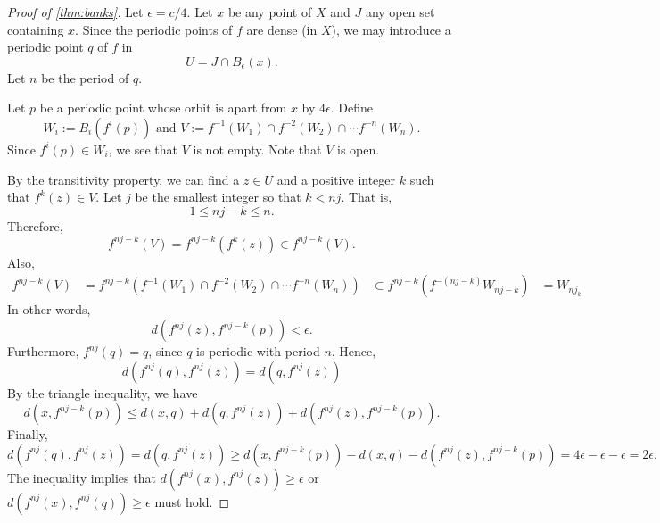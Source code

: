 \documentclass[12pt,draft,twoside]{article}
\begin{document}
\begin{proof}[Proof of \ref{thm:banks}]
  Let $\epsilon = c/4$. Let $x$ be any point of $X$ and $J$ any open set containing $x$.
  Since the periodic points of $f$ are dense (in $X$), we may introduce a periodic point
  $q$ of $f$ in
  \begin{equation*}
    U = J\cap B_\epsilon(x).
  \end{equation*}
  Let $n$ be the period of $q$.
  
  Let $p$ be a periodic point whose orbit is apart from $x$ by $4\epsilon$. Define
  \begin{equation*}
    W_i := B_i(f^i(p)) \text{ and } V := f^{-1}(W_1) \cap f^{-2}(W_2) \cap \cdots f^{-n}(W_n).
  \end{equation*}
  Since $f^i(p) \in W_i$, we see that $V$ is not empty. Note that $V$ is open.

  By the transitivity property, we can find a $z\in U$ and a positive integer $k$ such that
  $f^k(z) \in V$. Let $j$ be the smallest integer so that $k < nj$. That is,
  \begin{equation*}
    1 \leq nj - k \leq n.
  \end{equation*}
  Therefore,
  \begin{equation*}
    f^{nj - k} (V) = f^{nj - k} (f^k(z)) \in f^{nj-k}(V).
  \end{equation*}
  Also,
  \begin{align*}
     f^{nj - k}(V) &= f^{nj - k} (f^{-1}(W_1) \cap f^{-2}(W_2) \cap \cdots f^{-n}(W_n))
     &\subset f^{nj - k}(f^{-(nj - k)} W_{nj-k})
     &= W_{nj_k}
  \end{align*}
  In other words,
  \begin{equation*}
    d(f^{nj}(z), f^{nj - k}(p)) < \epsilon.
  \end{equation*}
  Furthermore, $f^{nj}(q) = q$, since $q$ is periodic with period $n$. Hence, 
  \begin{equation*}
    d(f^{nj}(q), f^{nj}(z)) = d(q, f^{nj}(z)) 
  \end{equation*}
  By the triangle inequality, we have
  \begin{equation*}
    d(x, f^{nj-k}(p)) \leq d(x,q) + d(q, f^{nj}(z)) + d(f^{nj}(z), f^{nj - k}(p)).
  \end{equation*}
  Finally, 
  \begin{equation*}
    d(f^{nj}(q), f^{nj}(z)) = d(q, f^{nj}(z)) \geq  d(x, f^{nj-k}(p)) - d(x,q) - d(f^{nj}(z), f^{nj - k}(p)) = 4\epsilon - \epsilon - \epsilon = 2\epsilon.
  \end{equation*}
  The inequality implies that $d(f^{nj}(x), f^{nj}(z)) \geq \epsilon$ or $d(f^{nj}(x), f^{nj}(q)) \geq \epsilon$ must hold.

\end{proof}
\end{document}
